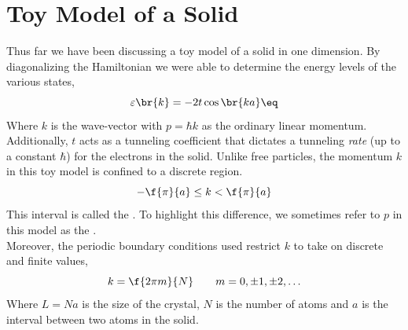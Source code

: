 \documentclass{article}
\begin{document}
\titlePage

\tableOfContents

\disclaimer

\section{Toy Model of a Solid}


\begin{center}
\end{center}


Thus far we have been discussing a toy model of a solid in one dimension. By diagonalizing the Hamiltonian we were able to determine the energy levels of the various states,
\[ \varepsilon\br{k} = - 2 t \cos\br{ka} \eq \label{eq:single_energy__band}\]
Where $k$ is the wave-vector with $p = \hbar k$ as the ordinary linear momentum. Additionally, $t$ acts as a tunneling coefficient that dictates a tunneling \textit{rate} (up to a constant $\hbar$) for the electrons in the solid. Unlike free particles, the momentum $k$ in this toy model is confined to a discrete region.
\[ -\f{\pi}{a} \leq k < \f{\pi}{a} \]
This interval is called the .
To highlight this difference, we sometimes refer to $p$ in this model as the .\\

Moreover, the periodic boundary conditions used restrict $k$ to take on discrete and finite values,
\[ k = \f{2 \pi m}{N} \qquad m = 0, \pm 1, \pm 2, \ldots \]
Where $L = Na$ is the size of the crystal, $N$ is the number of atoms and $a$ is the interval between two atoms in the solid.\\
\end{document}
